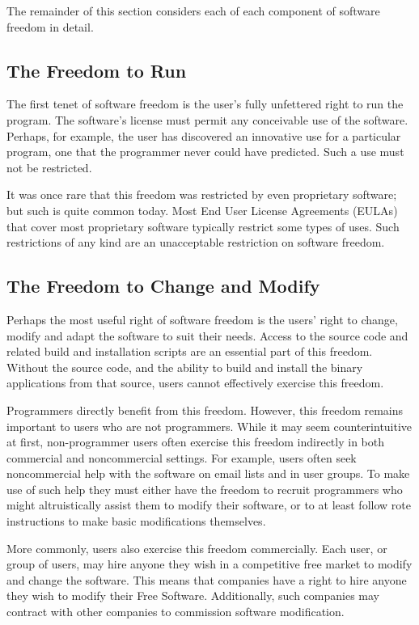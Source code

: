The remainder of this section considers each of each component of software
freedom in detail.

\subsection{The Freedom to Run}
\label{freedom-to-run}

The first tenet of software freedom is the user's fully unfettered right to
run the program.  The software's license must permit any conceivable use of
the software.  Perhaps, for example, the user has discovered an innovative
use for a particular program, one that the programmer never could have
predicted.  Such a use must not be restricted.

It was once rare that this freedom was restricted by even proprietary
software; but such is quite common today. Most End User License Agreements
(EULAs) that cover most proprietary software typically restrict some types of
uses.  Such restrictions of any kind are an unacceptable restriction on
software freedom.

\subsection{The Freedom to Change and Modify}

Perhaps the most useful right of software freedom is the users' right to
change, modify and adapt the software to suit their needs.  Access to the
source code and related build and installation scripts are an essential part
of this freedom.  Without the source code, and the ability to build and
install the binary applications from that source, users cannot effectively
exercise this freedom.

Programmers directly benefit from this freedom.  However, this freedom
remains important to users who are not programmers.  While it may seem
counterintuitive at first, non-programmer users often exercise this freedom
indirectly in both commercial and noncommercial settings.  For example, users
often seek noncommercial help with the software on email lists and in user
groups.  To make use of such help they must either have the freedom to
recruit programmers who might altruistically assist them to modify their
software, or to at least follow rote instructions to make basic modifications
themselves.

More commonly, users also exercise this freedom commercially.  Each user, or
group of users, may hire anyone they wish in a competitive free market to
modify and change the software.  This means that companies have a right to
hire anyone they wish to modify their Free Software.  Additionally, such
companies may contract with other companies to commission software
modification.


